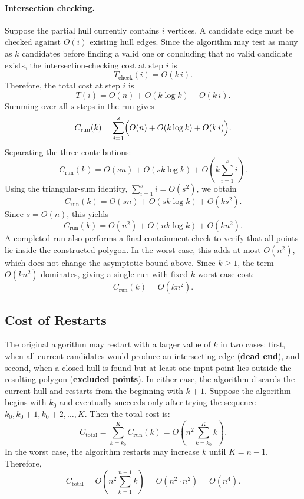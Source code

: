 \documentclass[a4paper,twoside]{article}
\begin{document}
\paragraph{Intersection checking.}
Suppose the partial hull currently contains $i$ vertices. A candidate edge must be checked against $O(i)$ existing hull edges. Since the algorithm may test as many as $k$ candidates before finding a valid one or concluding that no valid candidate exists, the intersection-checking cost at step $i$ is
\[
T_{\mathrm{check}}(i)=O(k\,i).
\]
Therefore, the total cost at step $i$ is
\[
T(i)=O(n)+O(k\log k)+O(k\,i).
\]
Summing over all $s$ steps in the run gives
\[
C_{\mathrm{run}}(k)
=
\sum_{i=1}^{s}\Bigl(O(n)+O(k\log k)+O(k\,i)\Bigr).
\]
Separating the three contributions:
\[
C_{\mathrm{run}}(k)
=
O(sn)+O(sk\log k)+O\!\left(k\sum_{i=1}^{s} i\right).
\]
Using the triangular-sum identity, $\sum_{i=1}^{s} i = O(s^2)$, we obtain
\[
C_{\mathrm{run}}(k)=O(sn)+O(sk\log k)+O(ks^2).
\]
Since $s = O(n)$, this yields
\[
C_{\mathrm{run}}(k)=O(n^2)+O(nk\log k)+O(kn^2).
\]
A completed run also performs a final containment check to verify that all points lie inside the constructed polygon. In the worst case, this adds at most $O(n^2)$, which does not change the asymptotic bound above.
Since $k \ge 1$, the term $O(kn^2)$ dominates, giving a single run with fixed $k$ worst-case cost:
\[
\boxed{C_{\mathrm{run}}(k)=O(kn^2).}
\]
\subsection{Cost of Restarts}
The original algorithm may restart with a larger value of $k$ in two cases: first, when all current candidates would produce an intersecting edge (\textbf{dead end}), and second, when a closed hull is found but at least one input point lies outside the resulting polygon (\textbf{excluded points}). In either case, the algorithm discards the current hull and restarts from the beginning with $k+1$.
Suppose the algorithm begins with $k_0$ and eventually succeeds only after trying the sequence $k_0, k_0+1, k_0+2, \dots, K$. Then the total cost is:
\[
C_{\mathrm{total}}
=
\sum_{k=k_0}^{K} C_{\mathrm{run}}(k)
=
O\!\left(n^2 \sum_{k=k_0}^{K} k\right).
\]
In the worst case, the algorithm restarts may increase $k$ until $K=n-1$. Therefore,
\[
C_{\mathrm{total}}
=
O\!\left(n^2 \sum_{k=1}^{n-1} k\right)
= O(n^2 \cdot n^2)
= \boxed{O(n^4).}
\]
\end{document}
